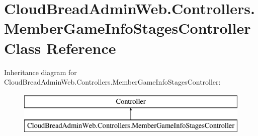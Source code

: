 \hypertarget{a00140}{}\section{Cloud\+Bread\+Admin\+Web.\+Controllers.\+Member\+Game\+Info\+Stages\+Controller Class Reference}
\label{a00140}
Inheritance diagram for Cloud\+Bread\+Admin\+Web.\+Controllers.\+Member\+Game\+Info\+Stages\+Controller\+:\begin{figure}[H]
\begin{center}
\leavevmode
\includegraphics[height=2.000000cm]{a00140}
\end{center}
\end{figure}
